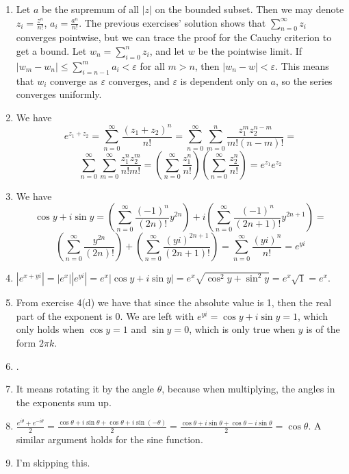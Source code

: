 \documentclass{../note}
\begin{document}
\begin{solution}
\begin{enumerate}[label=(\alph*)]
    \item Let $a$ be the supremum of all $|z|$ on the bounded subset. Then we may denote $z_i = \frac{z^n}{n!}$, $a_i = \frac{a^n}{n!}$. The previous exercises' solution shows that $\sum_{n=0}^{\infty} z_i$ converges pointwise, but we can trace the proof for the Cauchy criterion to get a bound. Let $w_n = \sum_{i=0}^{n} z_i$, and let $w$ be the pointwise limit. If $|w_m - w_n| \leq \sum_{i=n-1}^{m} a_i < \varepsilon$ for all $m > n$, then $|w_n - w| < \varepsilon$. This means that $w_i$ converge as $\varepsilon$ converges, and $\varepsilon$ is dependent only on $a$, so the series converges uniformly.
    \item We have 
    \[e^{z_1 + z_2} = \sum_{n=0}^{\infty} \frac{(z_1 + z_2)^n}{n!} = \sum_{n=0}^{\infty} \sum_{m=0}^n \frac{z_1^m z_2^{n-m}}{m!(n-m)!} =\]
    \[ \sum_{n=0}^{\infty} \sum_{m=0}^{\infty} \frac{z_1^n z_2^m}{n!m!} = \left(\sum_{n=0}^{\infty}\frac{z_1^n}{n!}\right)\left(\sum_{n=0}^{\infty}\frac{z_2^n}{n!}\right) = e^{z_1} e^{z_2}\]
    \item We have \[\cos y + i\sin y = \left(\sum_{n=0}^{\infty} \frac{(-1)^n}{(2n)!} y^{2n} \right) + i\left( \sum_{n=0}^{\infty} \frac{(-1)^n}{(2n+1)!} y^{2n+1} \right) =\] \[ \left( \sum_{n=0}^{\infty} \frac{y^{2n}}{(2n)!} \right) + \left( \sum_{n=0}^{\infty} \frac{(yi)^{2n+1}}{(2n+1)!} \right) = \sum_{n=0}^{\infty} \frac{(yi)^n}{n!} = e^{yi}\]
    \item $|e^{x+yi}| = |e^x||e^{yi}| = e^x|\cos y + i\sin y| = e^x\sqrt{\cos^2 y + \sin^2 y} = e^x\sqrt{1} = e^x$.
    \item From exercise 4(d) we have that since the absolute value is 1, then the real part of the exponent is 0. We are left with $e^{yi} = \cos y + i\sin y = 1$, which only holds when $\cos y = 1$ and $\sin y = 0$, which is only true when $y$ is of the form $2\pi k$.
    \item .
    \item It means rotating it by the angle $\theta$, because when multiplying, the angles in the exponents sum up.
    \item $\frac{e^{i\theta} + e^{-i\theta}}{2} = \frac{\cos \theta + i\sin \theta + \cos \theta + i\sin (-\theta)}{2} = \frac{\cos \theta + i\sin \theta + \cos \theta -i\sin \theta}{2} = \cos\theta$. A similar argument holds for the sine function.
    \item I'm skipping this.
\end{enumerate}
\end{solution}
\end{document}
